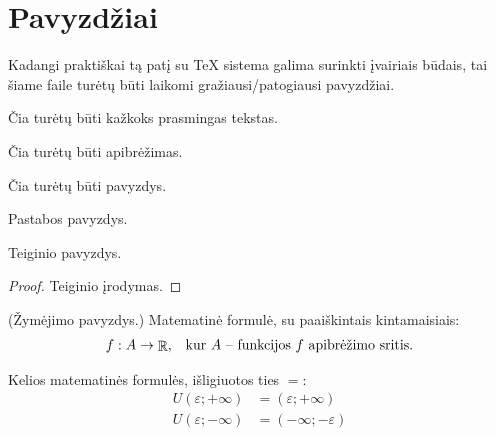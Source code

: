 \chapter{Pavyzdžiai}

Kadangi praktiškai tą patį su TeX sistema galima surinkti įvairiais
būdais, tai šiame faile turėtų būti laikomi gražiausi/patogiausi 
pavyzdžiai.

Čia turėtų būti kažkoks prasmingas tekstas.

\begin{defn}
  Čia turėtų būti apibrėžimas.
\end{defn}

\begin{exmp}[Pavyzdys]
  Čia turėtų būti pavyzdys.
\end{exmp}

\begin{note}
  Pastabos pavyzdys.
\end{note}

\begin{prop}
  Teiginio pavyzdys.
  \begin{proof}
    Teiginio įrodymas.
  \end{proof}
\end{prop}

\begin{notation}
  (Žymėjimo pavyzdys.)
  Matematinė formulė, su paaiškintais kintamaisiais:
  \[
  \begin{array}[]{c l}
    f : A \to \RSET, & \text{kur $A$ – funkcijos $f$ apibrėžimo sritis.}
  \end{array}
  \]
\end{notation}

Kelios matematinės formulės, išligiuotos ties $=$:
\begin{align*}
  U(\varepsilon; +\infty) &= (\varepsilon; +\infty) \\
  U(\varepsilon; -\infty) &= (-\infty; -\varepsilon)
\end{align*}
